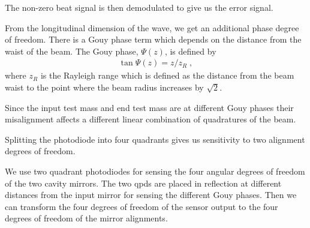 


The non-zero beat signal is then demodulated to give us the error signal.



From the longitudinal dimension of the wave, we get an additional phase degree
of freedom. There is a Gouy phase term which depends on the distance from the waist
of the beam. The Gouy phase, $\Psi(z)$, is defined by
\begin{align*}
  \tan{\Psi(z)} = z/z_R \;,
\end{align*}
where $z_R$ is the Rayleigh range which is defined as the distance from the beam
waist to the point where the beam radius increases by $\sqrt{2}$.


Since the input test mass and end test mass are at different Gouy phases
their misalignment affects a different linear combination of quadratures of the
beam.


Splitting the photodiode into four quadrants gives us sensitivity to two
alignment degrees of freedom.

%
%

We use two quadrant photodiodes for sensing the four angular degrees
of freedom of the two cavity mirrors.
The two \ac{qpd}s are placed in reflection at different distances from the
input mirror for sensing the different Gouy phases.
Then we can transform the four degrees of freedom of the sensor output to the
four degrees of freedom of the mirror alignments.



